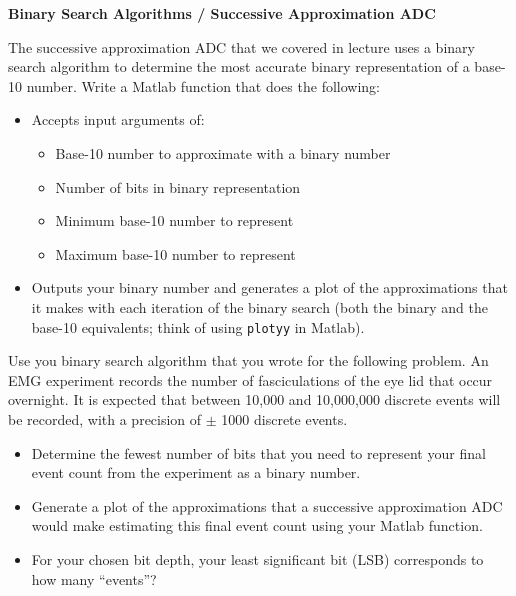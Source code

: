 \item {\bf Binary Search Algorithms / Successive Approximation ADC}

The successive approximation ADC that we covered in lecture uses a binary search algorithm to determine the most accurate binary representation of a base-10 number.  Write a Matlab function that does the following:

\begin{itemize}
    \item Accepts input arguments of:
    \begin{itemize}
        \item Base-10 number to approximate with a binary number
        \item Number of bits in binary representation
        \item Minimum base-10 number to represent
        \item Maximum base-10 number to represent
    \end{itemize}

    \item Outputs your binary number and generates a plot of the approximations that it makes with each iteration of the binary search (both the binary and the base-10 equivalents; think of using {\tt plotyy} in Matlab).
\end{itemize}

Use you binary search algorithm that you wrote for the following problem.  An EMG experiment records the number of fasciculations of the eye lid that occur overnight.  It is expected that between 10,000 and 10,000,000 discrete events will be recorded, with a precision of $\pm$ 1000 discrete events.

\begin{itemize}
    \item Determine the fewest number of bits that you need to represent your final event count from the experiment as a binary number.
    \item Generate a plot of the approximations that a successive approximation ADC would make estimating this final event count using your Matlab function.
    \item For your chosen bit depth, your least significant bit (LSB) corresponds to how many ``events''?
\end{itemize}
